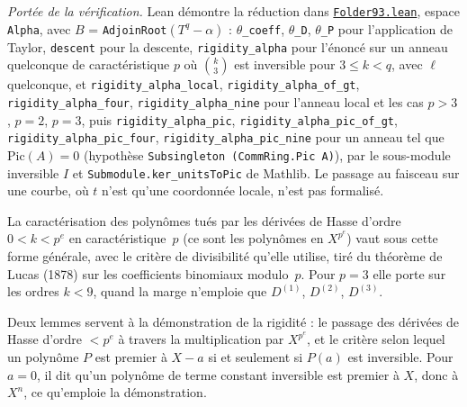 \begingroup\raggedright
\noindent\emph{Portée de la vérification.} Lean démontre la réduction dans \href{\leanblob/AlgebraicGeometry/Folder93.lean}{\texttt{Folder93.\allowbreak{}lean}}, espace \texttt{Alpha}, avec $B$ = \texttt{AdjoinRoot}$(T^q - \alpha)$ : \texttt{$\theta$\_coeff}, \texttt{$\theta$\_D}, \texttt{$\theta$\_P} pour l'application de Taylor, \texttt{descent} pour la descente, \texttt{rigidity\_alpha} pour l'énoncé sur un anneau quelconque de caractéristique $p$ où $\binom k3$ est inversible pour $3 \leq k < q$, avec $\ell$ quelconque, et \texttt{rigidity\_alpha\_local}, \texttt{rigidity\_alpha\_of\_gt}, \texttt{rigidity\_alpha\_four}, \texttt{rigidity\_alpha\_nine} pour l'anneau local et les cas $p > 3$, $p = 2$, $p = 3$, puis \texttt{rigidity\_alpha\_pic}, \texttt{rigidity\_alpha\_pic\_of\_gt}, \texttt{rigidity\_alpha\_pic\_four}, \texttt{rigidity\_alpha\_pic\_nine} pour un anneau tel que $\mathrm{Pic}(A) = 0$ (hypothèse \texttt{Subsingleton (CommRing.Pic A)}), par le sous-module inversible $I$ et \texttt{Submodule.ker\_unitsToPic} de Mathlib. Le passage au faisceau sur une courbe, où $t$ n'est qu'une coordonnée locale, n'est pas formalisé.\par\endgroup

\begin{remarque}
La caractérisation des polynômes tués par les dérivées de Hasse d'ordre $0 < k < p^e$ en caractéristique~$p$ (ce sont les polynômes en $X^{p^e}$) vaut sous cette forme générale, avec le critère de divisibilité qu'elle utilise, tiré du théorème de Lucas (1878) \cite{lucas1878} sur les coefficients binomiaux modulo~$p$. Pour $p = 3$ elle porte sur les ordres $k < 9$, quand la marge n'emploie que $D^{(1)}$, $D^{(2)}$, $D^{(3)}$.
\end{remarque}

\begin{remarque}
Deux lemmes servent à la démonstration de la rigidité : le passage des dérivées de Hasse d'ordre $< p^e$ à travers la multiplication par $X^{p^e}$, et le critère selon lequel un polynôme $P$ est premier à $X - a$ si et seulement si $P(a)$ est inversible. Pour $a = 0$, il dit qu'un polynôme de terme constant inversible est premier à $X$, donc à $X^n$, ce qu'emploie la démonstration.
\end{remarque}
